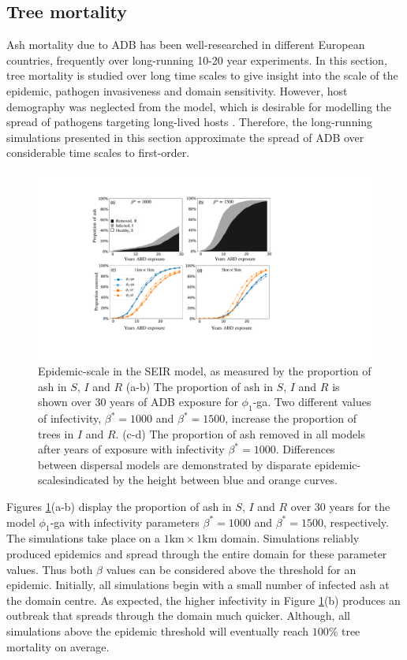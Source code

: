 \subsection{Tree mortality}
\label{sec:tree-mortality}

Ash mortality due to ADB has been well-researched in different European countries, frequently over long-running 10-20 year experiments.
In this section, tree mortality is studied over long time scales to give insight into the scale of the epidemic, pathogen invasiveness and domain sensitivity.
However, host demography was neglected from the model, which is desirable for modelling the spread of pathogens targeting long-lived hosts \cite{doi:10.1098/rstb.1996.0059}.
Therefore, the long-running simulations presented in this section approximate the spread of ADB over considerable time scales to first-order.

\begin{figure}
    \centering
    \includegraphics[scale=0.46]{chapter6/figures/fig6-mortality.pdf}
    \caption{Epidemic-scale in the SEIR model, as measured by the proportion of ash in $S$, $I$ and $R$ (a-b) 
    The proportion of ash in $S$, $I$ and $R$ is shown over $30$ years of ADB exposure for $\phi_1$-ga. 
    Two different values of infectivity, $\beta^*=1000$ and $\beta^*=1500$, increase the proportion of trees in $I$ and $R$. 
    (c-d) The proportion of ash removed in all models after years of exposure with infectivity $\beta^*=1000$. 
    Differences between dispersal models are demonstrated by disparate epidemic-scales\textemdash indicated by the height between blue and orange curves.}
    \label{fig:ash-mortalty}
\end{figure}

Figures \ref{fig:ash-mortalty}(a-b) display the proportion of ash in $S$, $I$ and $R$ over $30$ years for the model $\phi_1$-ga with 
infectivity parameters $\beta^*=1000$ and $\beta^*=1500$, respectively. The simulations take place on a $1\mathrm{km}\times 1 \mathrm{km}$ domain. Simulations reliably produced epidemics and spread through the entire domain for these parameter values. Thus both $\beta$ values can be considered above the threshold for an epidemic.
Initially, all simulations begin with a small number of infected ash at the domain centre.
As expected, the higher infectivity in Figure \ref{fig:ash-mortalty}(b) produces an outbreak that spreads through the domain much quicker.
Although, all simulations above the epidemic threshold will eventually reach $100\%$ tree mortality on average.

